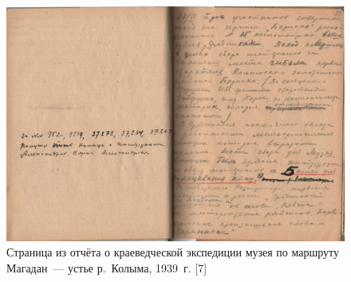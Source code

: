 \begin{figure}[H]
  \begin{center}
    \includegraphics[width=1\textwidth]{authors/usupova-fig-2.jpg}
  \end{center}
  \caption{Страница из отчёта о краеведческой экспедиции музея по маршруту Магадан~--- устье р.~Колыма, 1939~г. [7]}
  \label{fig:usupova-fig-2}
  \vspace{-8pt}
\end{figure}
